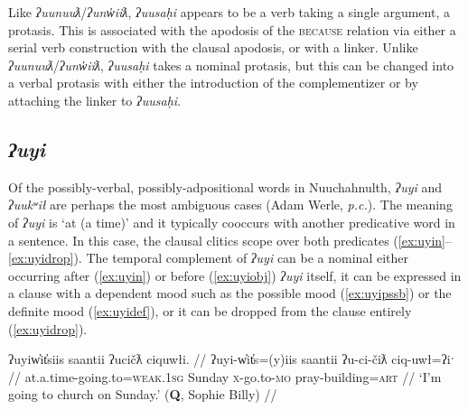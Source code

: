 
Like \textit{ʔuunuuƛ}/\textit{ʔunw̓iiƛ}, \textit{ʔuusaḥi} appears to be a verb taking a single argument, a protasis. This is associated with the apodosis of the \textsc{because} relation via either a serial verb construction with the clausal apodosis, or with a linker. Unlike \textit{ʔuunuuƛ}/\textit{ʔunw̓iiƛ}, \textit{ʔuusaḥi} takes a nominal protasis, but this can be changed into a verbal protasis with either the introduction of the complementizer or by attaching the linker to \textit{ʔuusaḥi}.

\subsection{\textit{ʔuyi}} \label{sec:link:uyi}

Of the possibly-verbal, possibly-adpositional words in Nuuchahnulth, \textit{ʔuyi} and \textit{ʔuukʷił} are perhaps the most ambiguous cases (Adam Werle, \textit{p.c.}). The meaning of \textit{ʔuyi} is `at (a time)' and it typically cooccurs with another predicative word in a sentence. In this case, the clausal clitics scope over both predicates (\ref{ex:uyin}--\ref{ex:uyidrop}). The temporal complement of \textit{ʔuyi} can be a nominal either occurring after (\ref{ex:uyin}) or before (\ref{ex:uyiobj}) \textit{ʔuyi} itself, it can be expressed in a clause with a dependent mood such as the possible mood (\ref{ex:uyipssb}) or the definite mood (\ref{ex:uyidef}), or it can be dropped from the clause entirely (\ref{ex:uyidrop}).

\ex \label{ex:uyin}
\begingl
\glpreamble ʔuyiw̓it̓siis saantii ʔucičƛ ciquwłi. //
\gla ʔuyi-w̓it̓s=(y)iis saantii ʔu-ci-čiƛ ciq-uwł=ʔiˑ //
\glb at.a.time-going.to=\textsc{weak.1sg} Sunday \textsc{x}-go.to-\textsc{mo} pray-building=\textsc{art} //
\glft `I'm going to church on Sunday.' (\textbf{Q}, Sophie Billy) //
\endgl
\xe


